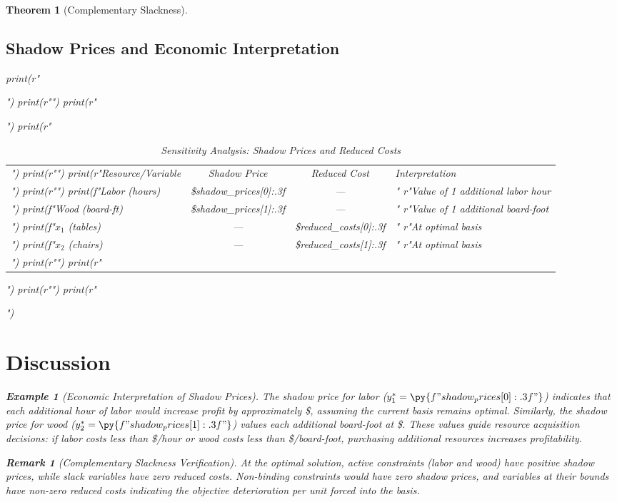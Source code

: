 \documentclass[a4paper, 11pt]{article}
\newtheorem{theorem}{Theorem}[section]
\newtheorem{example}{Example}[section]
\newtheorem{remark}{Remark}[section]
\begin{document}
\begin{theorem}[Complementary Slackness]
\subsection{Shadow Prices and Economic Interpretation}

\begin{pycode}
print(r"\begin{table}[H]")
print(r"\centering")
print(r"\caption{Sensitivity Analysis: Shadow Prices and Reduced Costs}")
print(r"\begin{tabular}{lccl}")
print(r"\toprule")
print(r"Resource/Variable & Shadow Price & Reduced Cost & Interpretation \\")
print(r"\midrule")
print(f"Labor (hours) & \${shadow_prices[0]:.3f} & --- & "
      r"Value of 1 additional labor hour \\")
print(f"Wood (board-ft) & \${shadow_prices[1]:.3f} & --- & "
      r"Value of 1 additional board-foot \\")
print(f"$x_1$ (tables) & --- & \${reduced_costs[0]:.3f} & "
      r"At optimal basis \\")
print(f"$x_2$ (chairs) & --- & \${reduced_costs[1]:.3f} & "
      r"At optimal basis \\")
print(r"\bottomrule")
print(r"\end{tabular}")
print(r"\label{tab:sensitivity}")
print(r"\end{table}")
\end{pycode}

\section{Discussion}

\begin{example}[Economic Interpretation of Shadow Prices]
The shadow price for labor ($y_1^* = \py{f"{shadow_prices[0]:.3f}"}$) indicates that each
additional hour of labor would increase profit by approximately \$,
assuming the current basis remains optimal. Similarly, the shadow price for wood
($y_2^* = \py{f"{shadow_prices[1]:.3f}"}$) values each additional board-foot at
\$. These values guide resource acquisition decisions: if labor
costs less than \$/hour or wood costs less than
\$/board-foot, purchasing additional resources increases profitability.
\end{example}

\begin{remark}[Complementary Slackness Verification]
At the optimal solution, active constraints (labor and wood) have positive shadow prices,
while slack variables have zero reduced costs. Non-binding constraints would have zero shadow
prices, and variables at their bounds have non-zero reduced costs indicating the objective
deterioration per unit forced into the basis.
\end{remark}


\end{theorem}
\end{document}
